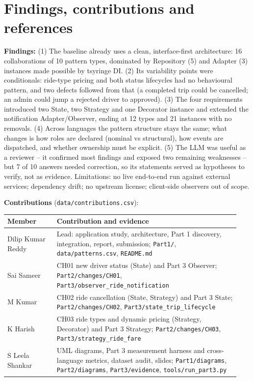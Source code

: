 \documentclass[11pt,a4paper]{article}
\begin{document}
\section{Findings, contributions and references}
\textbf{Findings:} (1) The baseline already uses a clean, interface-first architecture: 16 collaborations of 10 pattern types, dominated by
Repository (5) and Adapter (3) instances made possible by tsyringe DI. (2) Its variability points were conditionals: ride-type pricing and
both status lifecycles had no behavioural pattern, and two defects followed from that (a completed trip could be cancelled; an admin could
jump a rejected driver to approved). (3) The four requirements introduced two State, two Strategy and one Decorator instance and extended
the notification Adapter/Observer, ending at 12 types and 21 instances with no removals. (4) Across languages the pattern structure stays the
same; what changes is how roles are declared (nominal vs structural), how events are dispatched, and whether ownership must be explicit.
(5) The LLM was useful as a reviewer -- it confirmed most findings and exposed two remaining weaknesses -- but 7 of 10 answers needed correction,
so its statements served as hypotheses to verify, not as evidence.
Limitations: no live end-to-end run against external services; dependency drift; no upstream license; client-side observers out of scope.

\textbf{Contributions} (\texttt{data/contributions.csv}):\\
\begin{tabular}{@{}P{0.2\linewidth}P{0.74\linewidth}@{}}\toprule Member & Contribution and evidence\\\midrule
Dilip Kumar Reddy & Lead: application study, architecture, Part 1 discovery, integration, report, submission; \texttt{Part1/}, \texttt{data/patterns.csv}, \texttt{README.md}\\
Sai Sameer & CH01 new driver status (State) and Part 3 Observer; \texttt{Part2/changes/CH01}, \texttt{Part3/observer\_ride\_notification}\\
M Kumar & CH02 ride cancellation (State, Strategy) and Part 3 State; \texttt{Part2/changes/CH02}, \texttt{Part3/state\_trip\_lifecycle}\\
K Harish & CH03 ride types and dynamic pricing (Strategy, Decorator) and Part 3 Strategy; \texttt{Part2/changes/CH03}, \texttt{Part3/strategy\_ride\_fare}\\
S Leela Shankar & UML diagrams, Part 3 measurement harness and cross-language metrics, dataset audit, slides; \texttt{Part1/diagrams}, \texttt{Part2/diagrams}, \texttt{Part3/evidence}, \texttt{tools/run\_part3.py}\\
\bottomrule\end{tabular}
\end{document}

